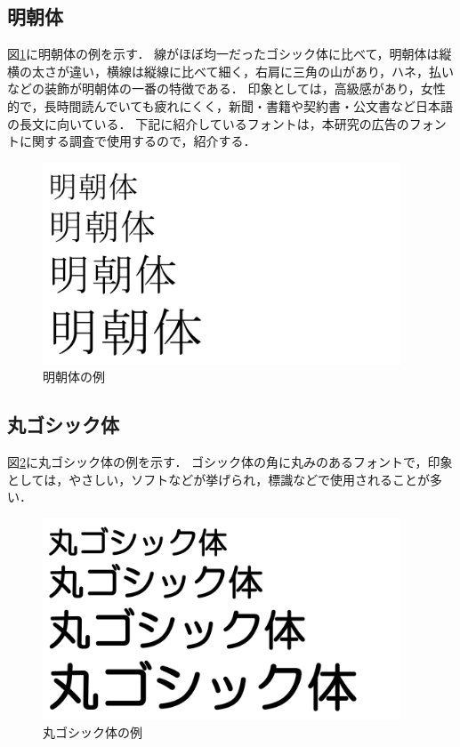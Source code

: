 \documentclass[12pt,a4j,titlepage]{ltjsarticle}
\begin{document}
\subsection{明朝体}
図\ref{fig:明朝体の例}に明朝体の例を示す．
線がほぼ均一だったゴシック体に比べて，明朝体は縦横の太さが違い，横線は縦線に比べて細く，右肩に三角の山があり，ハネ，払いなどの装飾が明朝体の一番の特徴である\cite{mu}．
印象としては，高級感があり，女性的で，長時間読んでいても疲れにくく，新聞・書籍や契約書・公文書など日本語の長文に向いている．
下記に紹介しているフォントは，本研究の広告のフォントに関する調査で使用するので，紹介する．

\begin{figure}[H]
\begin{center}
 \includegraphics[height=60mm]{figures/明朝体の例.pdf}
\end{center}
 \caption{明朝体の例}
 \label{fig:明朝体の例}
\end{figure}

\subsection{丸ゴシック体}
図\ref{fig:丸ゴシック体の例}に丸ゴシック体の例を示す．
ゴシック体の角に丸みのあるフォントで，印象としては，やさしい，ソフトなどが挙げられ，標識などで使用されることが多い．

\begin{figure}[H]
\begin{center}
 \includegraphics[height=60mm]{figures/丸ゴシック体の例.pdf}
\end{center}
 \caption{丸ゴシック体の例}
 \label{fig:丸ゴシック体の例}
\end{figure}
\end{document}
